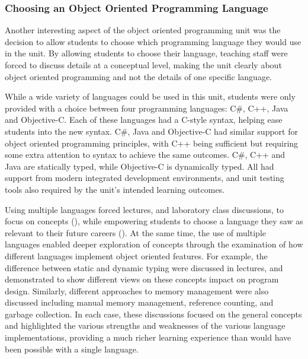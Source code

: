 \subsubsection{Choosing an Object Oriented Programming Language} %
\label{ssub:choosing_an_object_oriented_programming_language}

Another interesting aspect of the object oriented programming unit was the decision to allow students to choose which programming language they would use in the unit. By allowing students to choose their language, teaching staff were forced to discuss details at a conceptual level, making the unit clearly about object oriented programming and not the details of one specific language. 

While a wide variety of languages could be used in this unit, students were only provided with a choice between four programming languages: C\#, C++, Java and Objective-C. Each of these languages had a C-style syntax, helping ease students into the new syntax. C\#, Java and Objective-C had similar support for object oriented programming principles, with C++ being sufficient but requiring some extra attention to syntax to achieve the same outcomes. C\#, C++ and Java are statically typed, while Objective-C is dynamically typed. All had support from modern integrated development environments, and unit testing tools also required by the unit's intended learning outcomes.

Using multiple languages forced lectures, and laboratory class discussions, to focus on concepts (), while empowering students to choose a language they saw as relevant to their future careers (). At the same time, the use of multiple languages enabled deeper exploration of concepts through the examination of how different languages implement object oriented features. For example, the difference between static and dynamic typing were discussed in lectures, and demonstrated to show different views on these concepts impact on program design. Similarly, different approaches to memory management were also discussed including manual memory management, reference counting, and garbage collection. In each case, these discussions focused on the general concepts and highlighted the various strengths and weaknesses of the various language implementations, providing a much richer learning experience than would have been possible with a single language.  



